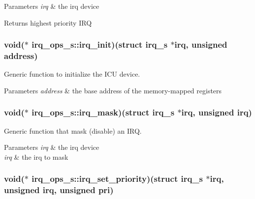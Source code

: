 \begin{DoxyParams}{Parameters}
{\em irq} & the irq device \\
\hline
\end{DoxyParams}
\begin{DoxyReturn}{Returns}
highest priority I\-R\-Q 
\end{DoxyReturn}
\hypertarget{structirq__ops__s_af7516d83c7d067bc9c7e3c410faab92b}{
\subsubsection[{irq\-\_\-init}]{\setlength{\rightskip}{0pt plus 5cm}void($\ast$ irq\-\_\-ops\-\_\-s\-::irq\-\_\-init)(struct {\bf irq\-\_\-s} $\ast$irq, unsigned address)}}\label{structirq__ops__s_af7516d83c7d067bc9c7e3c410faab92b}


Generic function to initialize the I\-C\-U device. 


\begin{DoxyParams}{Parameters}
{\em address} & the base address of the memory-\/mapped registers \\
\hline
\end{DoxyParams}
\hypertarget{structirq__ops__s_a4c58f73360cca86bafa18725c9c7d88d}{
\subsubsection[{irq\-\_\-mask}]{\setlength{\rightskip}{0pt plus 5cm}void($\ast$ irq\-\_\-ops\-\_\-s\-::irq\-\_\-mask)(struct {\bf irq\-\_\-s} $\ast$irq, unsigned irq)}}\label{structirq__ops__s_a4c58f73360cca86bafa18725c9c7d88d}


Generic function that mask (disable) an I\-R\-Q. 


\begin{DoxyParams}{Parameters}
{\em irq} & the irq device \\
\hline
{\em irq} & the irq to mask \\
\hline
\end{DoxyParams}
\hypertarget{structirq__ops__s_a006ff212c6c42156888344a2c69216c5}{
\subsubsection[{irq\-\_\-set\-\_\-priority}]{\setlength{\rightskip}{0pt plus 5cm}void($\ast$ irq\-\_\-ops\-\_\-s\-::irq\-\_\-set\-\_\-priority)(struct {\bf irq\-\_\-s} $\ast$irq, unsigned irq, unsigned pri)}}\label{structirq__ops__s_a006ff212c6c42156888344a2c69216c5}


